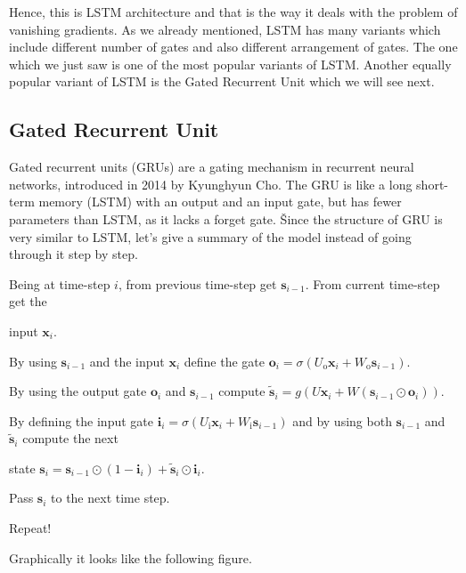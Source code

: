 
Hence, this is LSTM architecture and that is the way it deals with the problem of vanishing gradients. As we already
mentioned, LSTM has many variants which include different number of gates and also different arrangement of gates.
The one which we just saw is one of the most popular variants of LSTM. Another equally popular variant of LSTM is the
Gated Recurrent Unit which we will see next.

\subsection{Gated Recurrent Unit}

Gated recurrent units (GRUs) are a gating mechanism in recurrent neural networks, introduced in 2014 by Kyunghyun Cho.
The GRU is like a long short-term memory (LSTM) with an output and an input gate, but has fewer parameters than
LSTM, as it lacks a forget gate. \v

Since the structure of GRU is very similar to LSTM, let's give a summary of the model instead of going through it
step by step.

\ben
\item Being at time-step $i$, from previous time-step get $\boldsymbol{s}_{i-1}$. From current time-step get the
\item input $\boldsymbol{x}_{i}$.
\item By using $\boldsymbol{s}_{i-1}$ and the input $\boldsymbol{x}_{i}$ define the gate $\boldsymbol{o}_{i} = \sigma
(U_{\text{o}} \boldsymbol{x}_{i} + W_{\text{o}} \boldsymbol{s}_{i-1})$.
\item By using the output gate $\boldsymbol{o}_{i}$ and $\boldsymbol{s}_{i-1}$ compute $\boldsymbol{\tilde{s}}_i = g
(U\boldsymbol{x}_{i} + W (\boldsymbol{s}_{i-1} \odot \boldsymbol{o}_{i}))$.
\item By defining the input gate $\boldsymbol{i}_{i} = \sigma(U_{\text{i}} \boldsymbol{x}_{i} + W_{\text{i}}
\boldsymbol{s}_{i-1})$ and by using both $\boldsymbol{s}_{i-1}$ and $\boldsymbol{\tilde{s}}_i $ compute the next
\item state $\boldsymbol{s}_{i} = \boldsymbol{s}_{i-1} \odot (1 - \boldsymbol{i}_{i}) + \boldsymbol{\tilde{s}}_i
\odot \boldsymbol{i}_{i} $.
\item Pass $\boldsymbol{s}_{i}$ to the next time step.
\item Repeat!
\een

Graphically it looks like the following figure.


